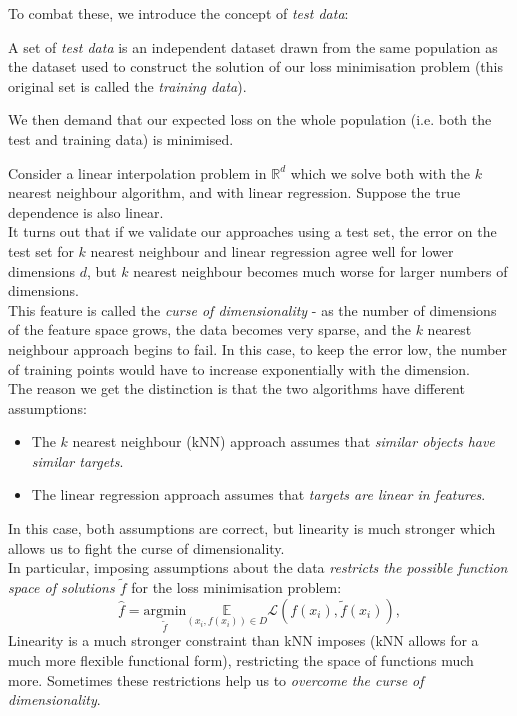 To combat these, we introduce the concept of \textit{test data}:

\begin{framedef}
A set of \textit{test data} is an independent dataset drawn from the same population as the dataset used to construct the solution of our loss minimisation problem (this original set is called the \textit{training data}).
\end{framedef}

We then demand that our expected loss on the whole population (i.e. both the test and training data) is minimised. 

\begin{frameex}
Consider a linear interpolation problem in $\mathbb{R}^d$ which we solve both with the $k$ nearest neighbour algorithm, and with linear regression. Suppose the true dependence is also linear.\\

It turns out that if we validate our approaches using a test set, the error on the test set for $k$ nearest neighbour and linear regression agree well for lower dimensions $d$, but $k$ nearest neighbour becomes much worse for larger numbers of dimensions.\\

This feature is called the \textit{curse of dimensionality} - as the number of dimensions of the feature space grows, the data becomes very sparse, and the $k$ nearest neighbour approach begins to fail. In this case, to keep the error low, the number of training points would have to increase exponentially with the dimension.\\

The reason we get the distinction is that the two algorithms have different assumptions:
\begin{itemize}
\item The $k$ nearest neighbour (kNN) approach assumes that \textit{similar objects have similar targets}.
\item The linear regression approach assumes that \textit{targets are linear in features}.
\end{itemize}
In this case, both assumptions are correct, but linearity is much stronger which allows us to fight the curse of dimensionality. \\

In particular, imposing assumptions about the data \textit{restricts the possible function space of solutions $\tilde{f}$} for the loss minimisation problem:
\begin{equation*}
\hat{f} = \underset{\tilde{f}}{\textrm{argmin}} \underset{(x_i,f(x_i)) \in D}{\mathbb{E}} \mathcal{L}(f(x_i), \tilde{f}(x_i)),
\end{equation*}
Linearity is a much stronger constraint than kNN imposes (kNN allows for a much more flexible functional form), restricting the space of functions much more. Sometimes these restrictions help us to \textit{overcome the curse of dimensionality}. 
\end{frameex}

